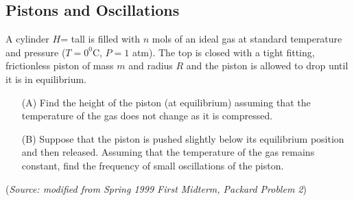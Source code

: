 \documentclass{article}
\begin{document}
\subsection{Pistons and Oscillations}

A cylinder $H$= tall is filled with $n$ mols of an ideal gas at standard temperature and pressure ($T=0^0$C, $P=1$ atm). The top is closed with a tight fitting, frictionless piston of mass $m$ and radius $R$ and the piston is allowed to drop until it is in equilibrium.
\begin{itemize}
	\item[(A)] Find the height of the piston (at equilibrium) assuming that the temperature of the gas does not change as it is compressed.
	\item[(B)] Suppose that the piston is pushed slightly below its equilibrium position and then released. Assuming that the temperature of the gas remains constant, find the frequency of small oscillations of the piston.
\end{itemize}
(\textit{Source: modified from Spring 1999 First Midterm, Packard Problem 2})
\end{document}
